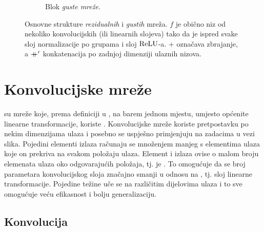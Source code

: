 \documentclass[utf8, diplomski, lmodern]{fer}
\begin{document}
\begin{figure}
\begin{subfigure}[t]{1\textwidth}
		\caption{Blok \textit{guste mreže}.}
		\label{subfig:densenet}
	\end{subfigure}
	\caption{Osnovne strukture \textit{rezidualnih} i \textit{gustih} mreža. $f$ je obično niz od nekoliko konvolucijskih (ili linearnih slojeva) tako da je ispred svake sloj normalizacije po grupama i sloj $\operatorname{ReLU}$-a. $+$ označava zbrajanje, a $\mathbin{+\mkern-10mu+}'$ konkatenacija po zadnjoj dimenziji ulaznih nizova.}
	\label{fig:resnet-densenet}
\end{figure}


\section{Konvolucijske mreže}

 su mreže koje, prema definiciji u \citet{Goodfellow:2016:DL}, na barem jednom mjestu, umjesto općenite linearne transformacije, koriste . Konvolucijske mreže koriste pretpostavku  po nekim dimenzijama ulaza i posebno se uspješno primjenjuju na zadacima u vezi slika. Pojedini elementi izlaza  računaju se množenjem manjeg  s elementima ulaza koje on prekriva na svakom položaju ulaza. Element i izlaza ovise o malom broju elemenata ulaza oko odgovarajućih položaja, tj.  je . To omogućuje da se broj parametara konvolucijskog sloja značajno smanji u odnosu na , tj. sloj linearne transformacije. Pojedine težine uče se na različitim dijelovima ulaza i to sve omogućuje veću efikasnost i bolju generalizaciju.

\subsection{Konvolucija}
\end{document}
